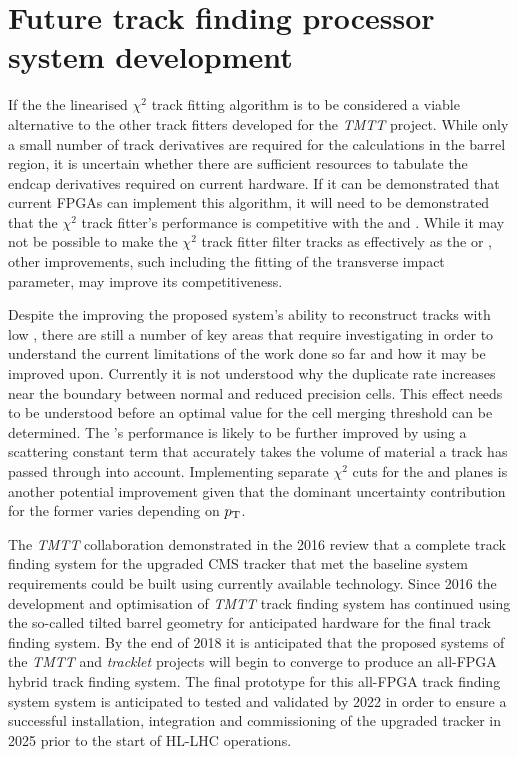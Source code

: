 \section{Future track finding processor system development}
If the the linearised $\chi^{2}$ track fitting algorithm is to be considered a viable alternative to the other track fitters developed for the \emph{TMTT} project.
While only a small number of track derivatives are required for the calculations in the barrel region, it is uncertain whether there are sufficient resources to tabulate the endcap derivatives required on current hardware.
If it can be demonstrated that current FPGAs can implement this algorithm, it will need to be demonstrated that the $\chi^{2}$ track fitter's performance is competitive with the \KF and \LR.
While it may not be possible to make the $\chi^{2}$ track fitter filter tracks as effectively as the \KF or \LR , other improvements, such including the fitting of the transverse impact parameter, may improve its competitiveness.

Despite the improving the proposed system's ability to reconstruct tracks with low \pT, there are still a number of key areas that require investigating in order to understand the current limitations of the work done so far and how it may be improved upon.
Currently it is not understood why the duplicate rate increases near the boundary between normal and reduced precision \HT cells.
This effect needs to be understood before an optimal value for the cell merging threshold can be determined.
The \KF's performance is likely to be further improved by using a scattering constant term that accurately takes the volume of material a track has passed through into account.
Implementing separate \KF $\chi^{2}$ cuts for the \rphi and \rz planes is another potential improvement given that the dominant uncertainty contribution for the former varies depending on $p_{\mathrm{T}}$.


The \emph{TMTT} collaboration demonstrated in the 2016 review that a complete track finding system for the upgraded CMS tracker that met the baseline system requirements could be built using currently available technology.
Since 2016 the development and optimisation of \emph{TMTT} track finding system has continued using the so-called tilted barrel geometry for anticipated hardware for the final track finding system.
By the end of 2018 it is anticipated that the proposed systems of the \emph{TMTT} and \emph{tracklet} projects will begin to converge to produce an all-FPGA hybrid track finding system.
The final prototype for this all-FPGA track finding system system is anticipated to tested and validated by 2022 in order to ensure a successful installation, integration and commissioning of the upgraded tracker in 2025 prior to the start of HL-LHC operations.

